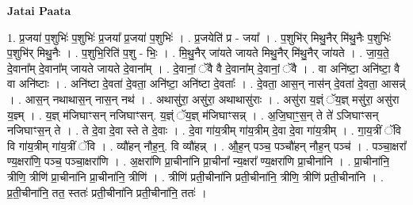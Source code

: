 \documentclass[17pt]{extarticle}
\begin{document}
\textbf{Jatai Paata} \newline

1. प्र॒जया॑ प॒शुभिः॑ प॒शुभिः॑ प्र॒जया᳚ प्र॒जया॑ प॒शुभिः॑ । . प्र॒जयेति॑ प्र - जया᳚ । . प॒शुभि॑र् मिथु॒नैर् मि॑थु॒नैः प॒शुभिः॑ प॒शुभि॑र् मिथु॒नैः । . प॒शुभि॒रिति॑ प॒शु - भिः॒ । . मि॒थु॒नैर् जा॑यते जायते मिथु॒नैर् मि॑थु॒नैर् जा॑यते । . जा॒य॒ते॒ दे॒वाना᳚म् दे॒वाना᳚म् जायते जायते दे॒वाना᳚म् । . दे॒वानां॒ ॅवै वै दे॒वाना᳚म् दे॒वानां॒ ॅवै । . वा अनि॑ष्टा॒ अनि॑ष्टा॒ वै वा अनि॑ष्टाः । . अनि॑ष्टा दे॒वता॑ दे॒वता॒ अनि॑ष्टा॒ अनि॑ष्टा दे॒वताः᳚ । . दे॒वता॒ आस॒न् नास॑न् दे॒वता॑ दे॒वता॒ आसन्न्॑ । . आस॒न् नथाथास॒न् नास॒न् नथ॑ । . अथासु॑रा॒ असु॑रा॒ अथाथासु॑राः । . असु॑रा य॒ज्ञ्ं ॅय॒ज्ञ् मसु॑रा॒ असु॑रा य॒ज्ञ्म् । . य॒ज्ञ् म॑जिघाꣳसन् नजिघाꣳसन्. य॒ज्ञ्ं ॅय॒ज्ञ् म॑जिघाꣳसन्न् । . अ॒जि॒घाꣳ॒॒स॒न् ते ते॑ ऽजिघाꣳसन् नजिघाꣳस॒न् ते । . ते दे॒वा दे॒वा स्ते ते दे॒वाः । . दे॒वा गा॑य॒त्रीम् गा॑य॒त्रीम् दे॒वा दे॒वा गा॑य॒त्रीम् । . गा॒य॒त्रीं ॅवि वि गा॑य॒त्रीम् गा॑य॒त्रीं ॅवि । . व्यौ॑हन् नौह॒न्॒. वि व्यौ॑हन्न् । . औ॒ह॒न् पञ्च॒ पञ्चौ॑हन् नौह॒न् पञ्च॑ । . पञ्चा॒क्षरा᳚ ण्य॒क्षरा॑णि॒ पञ्च॒ पञ्चा॒क्षरा॑णि । . अ॒क्षरा॑णि प्रा॒चीना॑नि प्रा॒चीना᳚ न्य॒क्षरा᳚ ण्य॒क्षरा॑णि प्रा॒चीना॑नि । . प्रा॒चीना॑नि॒ त्रीणि॒ त्रीणि॑ प्रा॒चीना॑नि प्रा॒चीना॑नि॒ त्रीणि॑ । . त्रीणि॑ प्रती॒चीना॑नि प्रती॒चीना॑नि॒ त्रीणि॒ त्रीणि॑ प्रती॒चीना॑नि । . प्र॒ती॒चीना॑नि॒ तत॒ स्ततः॑ प्रती॒चीना॑नि प्रती॒चीना॑नि॒ ततः॑ । \newline
\end{document}
